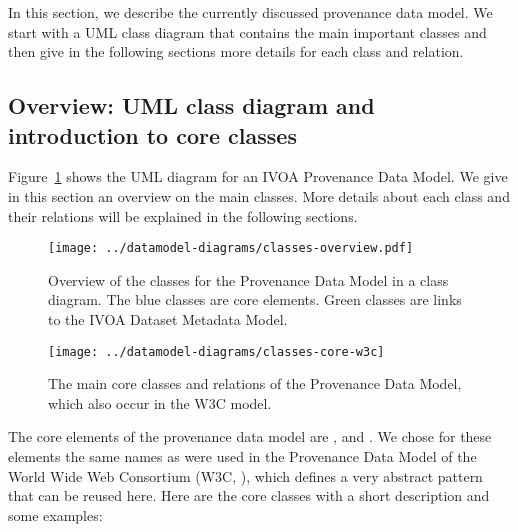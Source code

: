 In this section, we describe the currently discussed provenance data model. We 
start with a UML class diagram that contains the main important classes 
and then give in the following sections more details for each class and relation.

\subsection{Overview: UML class diagram and introduction to core classes}
Figure~\ref{fig:classdiagram} shows the UML diagram for an IVOA Provenance Data
Model. We give in this section an overview on the main classes. More details about 
each class and their relations will be explained in the following sections.

\begin{figure}[h]
\centering
\texttt{[image: ../datamodel-diagrams/classes-overview.pdf]}
\caption{Overview of the classes for the Provenance Data Model in a class diagram. The blue classes are core elements.
Green classes are links to the IVOA Dataset Metadata Model.}
\label{fig:classdiagram}
\end{figure}


\label{sec:core}

\begin{figure}[h]
\centering
\texttt{[image: ../datamodel-diagrams/classes-core-w3c]}
\caption{The main core classes and relations of the Provenance Data Model, which also occur in the W3C model.}
\label{fig:coreclasses}
\end{figure}

The core elements of the provenance data model are ,  and . 
We chose for these elements the same names as were used in the Provenance Data 
Model of the World Wide Web Consortium (W3C, \cite{std:W3CProvDM}), which defines 
a very abstract pattern that can be reused here. Here are the core classes with 
a short description and some examples:

